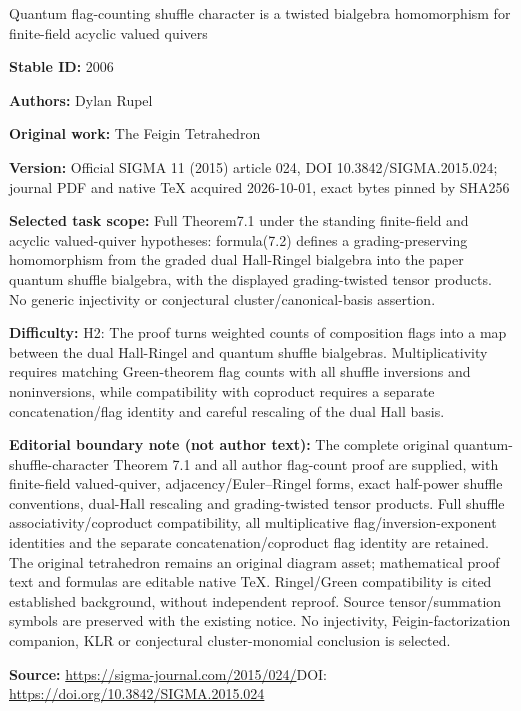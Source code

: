 \documentclass[11pt]{article}
\numberwithin{equation}{section}
\begin{document}
\begin{center}\Large Quantum flag-counting shuffle character is a twisted bialgebra homomorphism for finite-field acyclic valued quivers\end{center}
\noindent\textbf{Stable ID:} 2006\par
\noindent\textbf{Authors:} Dylan Rupel\par
\noindent\textbf{Original work:} The Feigin Tetrahedron\par
\noindent\textbf{Version:} Official SIGMA 11 (2015) article 024, DOI 10.3842/SIGMA.2015.024; journal PDF and native TeX acquired 2026-10-01, exact bytes pinned by SHA256\par
\noindent\textbf{Selected task scope:} Full Theorem7.1 under the standing finite-field and acyclic valued-quiver hypotheses: formula(7.2) defines a grading-preserving homomorphism from the graded dual Hall-Ringel bialgebra into the paper quantum shuffle bialgebra, with the displayed grading-twisted tensor products. No generic injectivity or conjectural cluster/canonical-basis assertion.\par
\noindent\textbf{Difficulty:} H2: The proof turns weighted counts of composition flags into a map between the dual Hall-Ringel and quantum shuffle bialgebras. Multiplicativity requires matching Green-theorem flag counts with all shuffle inversions and noninversions, while compatibility with coproduct requires a separate concatenation/flag identity and careful rescaling of the dual Hall basis.\par
\noindent\textbf{Editorial boundary note (not author text):} The complete original quantum-shuffle-character Theorem 7.1 and all author flag-count proof are supplied, with finite-field valued-quiver, adjacency/Euler–Ringel forms, exact half-power shuffle conventions, dual-Hall rescaling and grading-twisted tensor products. Full shuffle associativity/coproduct compatibility, all multiplicative flag/inversion-exponent identities and the separate concatenation/coproduct flag identity are retained. The original tetrahedron remains an original diagram asset; mathematical proof text and formulas are editable native TeX. Ringel/Green compatibility is cited established background, without independent reproof. Source tensor/summation symbols are preserved with the existing notice. No injectivity, Feigin-factorization companion, KLR or conjectural cluster-monomial conclusion is selected.\par
\noindent\textbf{Source:} \url{https://sigma-journal.com/2015/024/}\quad DOI: \url{https://doi.org/10.3842/SIGMA.2015.024}\par
\end{document}
